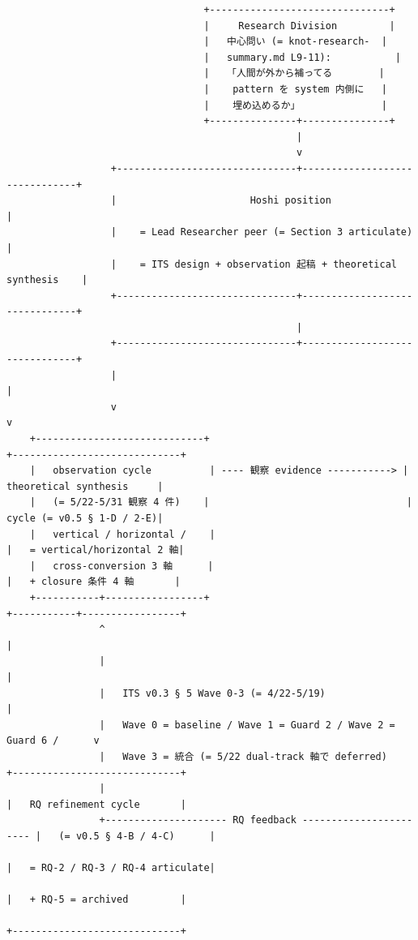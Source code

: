 \documentclass[
]{article}
\begin{document}
\begin{verbatim}
                                  +-------------------------------+
                                  |     Research Division         |
                                  |   中心問い (= knot-research-  |
                                  |   summary.md L9-11):           |
                                  |   「人間が外から補ってる        |
                                  |    pattern を system 内側に   |
                                  |    埋め込めるか」              |
                                  +---------------+---------------+
                                                  |
                                                  v
                  +-------------------------------+-------------------------------+
                  |                       Hoshi position                          |
                  |    = Lead Researcher peer (= Section 3 articulate)            |
                  |    = ITS design + observation 起稿 + theoretical synthesis    |
                  +-------------------------------+-------------------------------+
                                                  |
                  +-------------------------------+-------------------------------+
                  |                                                                |
                  v                                                                v
    +-----------------------------+                                  +-----------------------------+
    |   observation cycle          | ---- 観察 evidence -----------> |   theoretical synthesis     |
    |   (= 5/22-5/31 観察 4 件)    |                                  |   cycle (= v0.5 § 1-D / 2-E)|
    |   vertical / horizontal /    |                                  |   = vertical/horizontal 2 軸|
    |   cross-conversion 3 軸      |                                  |   + closure 条件 4 軸       |
    +-----------+-----------------+                                  +-----------+-----------------+
                ^                                                                 |
                |                                                                 |
                |   ITS v0.3 § 5 Wave 0-3 (= 4/22-5/19)                            |
                |   Wave 0 = baseline / Wave 1 = Guard 2 / Wave 2 = Guard 6 /      v
                |   Wave 3 = 統合 (= 5/22 dual-track 軸で deferred)         +-----------------------------+
                |                                                          |   RQ refinement cycle       |
                +--------------------- RQ feedback ----------------------- |   (= v0.5 § 4-B / 4-C)      |
                                                                           |   = RQ-2 / RQ-3 / RQ-4 articulate|
                                                                           |   + RQ-5 = archived         |
                                                                           +-----------------------------+
\end{verbatim}
\end{document}
